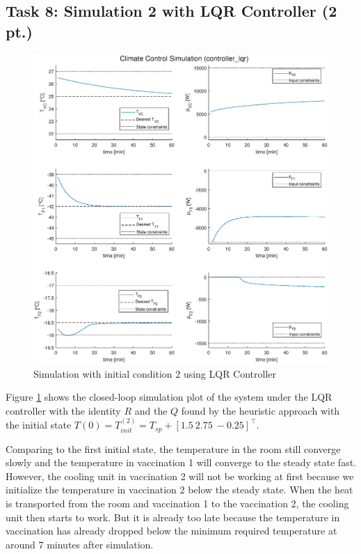 \documentclass[a4paper,twoside,11pt]{article}
\numberwithin{equation}{section}
\begin{document}
\subsection{Task 8: Simulation 2 with LQR Controller (2 pt.)}

\begin{figure}[ht]
\centering
\includegraphics[scale = 0.58]{image/8.eps}
\caption{Simulation with initial condition 2 using LQR Controller}
\label{fig:4}
\end{figure}

Figure \ref{fig:4} shows the closed-loop simulation plot of the system under the LQR controller with the identity $R$ and the $Q$ found by the heuristic approach with the initial state $T(0) = T^{(2)}_{init} = T_{sp} + [1.5 \ 2.75 \ -0.25]^\top$. 

Comparing to the first initial state, the temperature in the room still converge slowly and the temperature in vaccination 1 will converge to the steady state fast. However, the cooling unit in vaccination 2 will not be working at first because we initialize the temperature in vaccination 2 below the steady state. When the heat is transported from the room and vaccination 1 to the vaccination 2, the cooling unit then starts to work. But it is already too late because the temperature in vaccination has already dropped below the minimum required temperature at around 7 minutes after simulation. 
\end{document}
